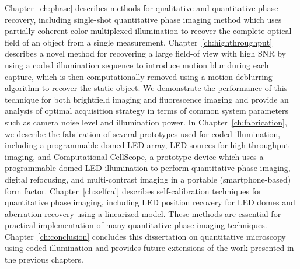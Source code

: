 Chapter~\ref{ch:phase} describes methods for qualitative and quantitative phase recovery, including single-shot quantitative phase imaging method which uses partially coherent color-multiplexed illumination to recover the complete optical field of an object from a single measurement. Chapter~\ref{ch:highthroughput} describes a novel method for recovering a large field-of view with high SNR by using a coded illumination sequence to introduce motion blur during each capture, which is then computationally removed using a motion deblurring algorithm to recover the static object. We demonstrate the performance of this technique for both brightfield imaging and fluorescence imaging and provide an analysis of optimal acquisition strategy in terms of common system parameters such as camera noise level and illumination power. In Chapter~\ref{ch:fabrication}, we describe the fabrication of several prototypes used for coded illumination, including a programmable domed LED array, LED sources for high-throughput imaging, and Computational CellScope, a prototype device which uses a programmable domed LED illumination to perform quantitative phase imaging, digital refocusing, and multi-contrast imaging in a portable (smartphone-based) form factor. Chapter~\ref{ch:selfcal} describes self-calibration techniques for quantitative phase imaging, including LED position recovery for LED domes and aberration recovery using a linearized model. These methods are essential for practical implementation of many quantitative phase imaging techniques. Chapter~\ref{ch:conclusion} concludes this dissertation on quantitative microscopy using coded illumination and provides future extensions of the work presented in the previous chapters.


